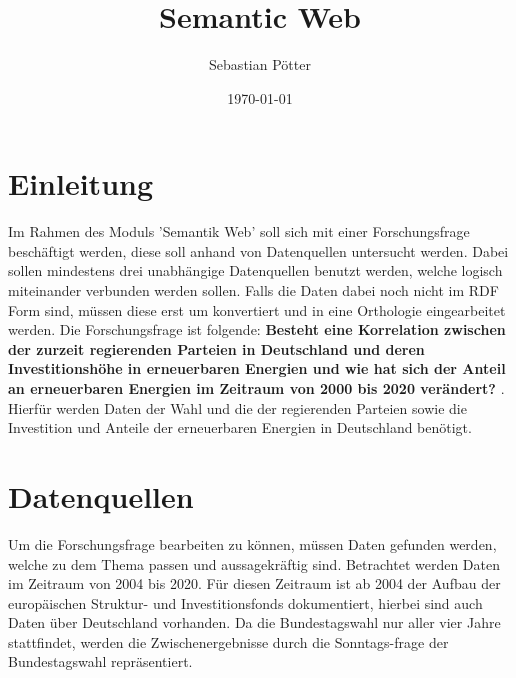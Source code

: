 \documentclass[12pt]{article}
\title{Semantic Web}
\author{Sebastian Pötter}
\date{\today}
\begin{document}
    
    \newpage
    

    \tableofcontents
    
    \newpage
        
    
    
    
    \section{Einleitung}
    
Im Rahmen des Moduls 'Semantik Web' soll sich mit einer Forschungsfrage beschäftigt werden, diese soll anhand von Datenquellen untersucht werden. Dabei sollen mindestens drei unabhängige Datenquellen benutzt werden, welche logisch miteinander verbunden werden sollen. Falls die Daten dabei noch nicht im RDF Form sind, müssen diese erst um konvertiert und in eine Orthologie eingearbeitet werden. Die Forschungsfrage ist folgende: \textbf{Besteht eine Korrelation zwischen der zurzeit regierenden Parteien in Deutschland und deren Investitionshöhe in erneuerbaren Energien und wie hat sich der Anteil an erneuerbaren Energien im Zeitraum von 2000 bis 2020 verändert? }. Hierfür werden Daten der Wahl und die der regierenden Parteien sowie die Investition und Anteile der erneuerbaren Energien in Deutschland benötigt. 

    \section{Datenquellen}

Um die Forschungsfrage bearbeiten zu können, müssen Daten gefunden werden, welche zu dem Thema passen und aussagekräftig sind. Betrachtet werden Daten im Zeitraum von 2004 bis 2020. Für diesen Zeitraum ist ab 2004 der Aufbau der europäischen Struktur- und Investitionsfonds dokumentiert, hierbei sind auch Daten über Deutschland vorhanden. Da die Bundestagswahl nur aller vier Jahre stattfindet, werden die Zwischenergebnisse durch die Sonntags-frage der Bundestagswahl repräsentiert.
\end{document}
